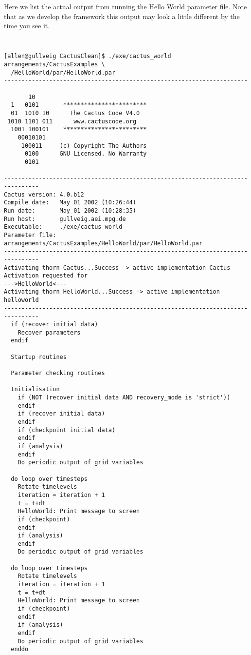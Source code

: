 \documentclass{article}
\begin{document}
Here we list the actual output from running the Hello World parameter
file. Note that as we develop the framework this output may look a
little different by the time you see it.

{\tt 
\begin{verbatim}
[allen@gullveig CactusClean]$ ./exe/cactus_world arrangements/CactusExamples \
  /HelloWorld/par/HelloWorld.par 
--------------------------------------------------------------------------------
       10                                  
  1   0101       ************************  
  01  1010 10      The Cactus Code V4.0    
 1010 1101 011      www.cactuscode.org     
  1001 100101    ************************  
    00010101                               
     100011     (c) Copyright The Authors  
      0100      GNU Licensed. No Warranty  
      0101                                 

--------------------------------------------------------------------------------
Cactus version: 4.0.b12
Compile date:   May 01 2002 (10:26:44)
Run date:       May 01 2002 (10:28:35)
Run host:       gullveig.aei.mpg.de
Executable:     ./exe/cactus_world
Parameter file: arrangements/CactusExamples/HelloWorld/par/HelloWorld.par
--------------------------------------------------------------------------------
Activating thorn Cactus...Success -> active implementation Cactus
Activation requested for 
--->HelloWorld<---
Activating thorn HelloWorld...Success -> active implementation helloworld
--------------------------------------------------------------------------------  
  if (recover initial data)
    Recover parameters
  endif

  Startup routines

  Parameter checking routines

  Initialisation
    if (NOT (recover initial data AND recovery_mode is 'strict'))
    endif
    if (recover initial data)
    endif
    if (checkpoint initial data)
    endif
    if (analysis)
    endif
    Do periodic output of grid variables

  do loop over timesteps
    Rotate timelevels
    iteration = iteration + 1
    t = t+dt
    HelloWorld: Print message to screen
    if (checkpoint)
    endif
    if (analysis)
    endif
    Do periodic output of grid variables

  do loop over timesteps
    Rotate timelevels
    iteration = iteration + 1
    t = t+dt
    HelloWorld: Print message to screen
    if (checkpoint)
    endif
    if (analysis)
    endif
    Do periodic output of grid variables
  enddo


\end{verbatim}}
\end{document}
